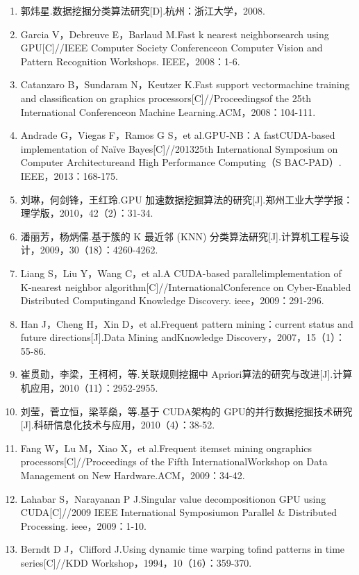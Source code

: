 \documentclass{article}
\begin{document}
\begin{enumerate}[labelsep = 0em, leftmargin = 10pt, itemindent = 0em]
        \item  郭炜星.数据挖掘分类算法研究[D].杭州：浙江大学，2008.
        \item  Garcia V，Debreuve E，Barlaud M.Fast k nearest neighborsearch using GPU[C]//IEEE Computer Society Conferenceon Computer Vision and Pattern Recognition Workshops. IEEE，2008：1-6.
        \item  Catanzaro B，Sundaram N，Keutzer K.Fast support vectormachine training and classification on graphics processors[C]//Proceedingsof the 25th International Conferenceon Machine Learning.ACM，2008：104-111.
        \item  Andrade G，Viegas F，Ramos G S，et al.GPU-NB：A fastCUDA-based implementation of Naïve Bayes[C]//201325th International Symposium on Computer Architectureand High Performance Computing（S BAC-PAD）. IEEE，2013：168-175.
        \item  刘琳，何剑锋，王红玲.GPU 加速数据挖掘算法的研究[J].郑州工业大学学报：理学版，2010，42（2）：31-34.
        \item  潘丽芳，杨炳儒.基于簇的 K 最近邻 (KNN) 分类算法研究[J].计算机工程与设计，2009，30（18）：4260-4262.
        \item  Liang S，Liu Y，Wang C，et al.A CUDA-based parallelimplementation of K-nearest neighbor algorithm[C]//InternationalConference on Cyber-Enabled Distributed Computingand Knowledge Discovery. ieee，2009：291-296.
        \item  Han J，Cheng H，Xin D，et al.Frequent pattern mining：current status and future directions[J].Data Mining andKnowledge Discovery，2007，15（1）：55-86.
        \item  崔贯勋，李梁，王柯柯，等.关联规则挖掘中 Apriori算法的研究与改进[J].计算机应用，2010（11）：2952-2955.
        \item  刘莹，菅立恒，梁莘燊，等.基于 CUDA架构的 GPU的并行数据挖掘技术研究[J].科研信息化技术与应用，2010（4）：38-52.
        \item  Fang W，Lu M，Xiao X，et al.Frequent itemset mining ongraphics processors[C]//Proceedings of the Fifth InternationalWorkshop on Data Management on New Hardware.ACM，2009：34-42.
        \item  Lahabar S，Narayanan P J.Singular value decompositionon GPU using CUDA[C]//2009 IEEE International Symposiumon Parallel \& Distributed Processing. ieee，2009：1-10.
        \item  Berndt D J，Clifford J.Using dynamic time warping tofind patterns in time series[C]//KDD Workshop，1994，10（16）：359-370.

\end{enumerate}
\end{document}

